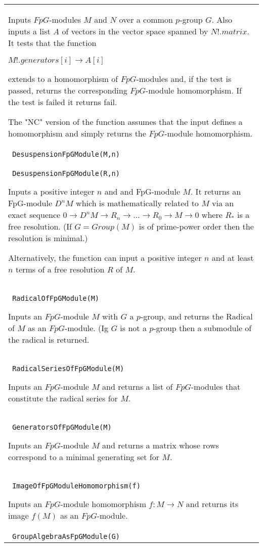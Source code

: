 \documentclass[a4paper,11pt]{report}
\begin{document}
{\begin{center}
\begin{tabular}{|l|}
 Inputs $FpG$-modules $M$ and $N$ over a common $p$-group $G$. Also inputs a list $A$ of vectors in the vector space spanned by $N!.matrix$. It tests that the function 

 $ M!.generators[i] \longrightarrow A[i]$ 

 extends to a homomorphism of $FpG$-modules and, if the test is passed, returns the corresponding $FpG$-module homomorphism. If the test is failed it returns fail. 

 The "NC" version of the function assumes that the input defines a homomorphism
and simply returns the $FpG$-module homomorphism. \\
 \index{DesuspensionFpGModule} \texttt{ DesuspensionFpGModule(M,n)} \\
 \texttt{ DesuspensionFpGModule(R,n) } 

 Inputs a positive integer $n$ and and FpG-module $M$. It returns an FpG-module $D^nM$ which is mathematically related to $M$ via an exact sequence $ 0 \longrightarrow D^nM \longrightarrow R_n \longrightarrow \ldots
\longrightarrow R_0 \longrightarrow M \longrightarrow 0$ where $R_\ast$ is a free resolution. (If $G=Group(M)$ is of prime-power order then the resolution is minimal.) 

 Alternatively, the function can input a positive integer $n$ and at least $n$ terms of a free resolution $R$ of $M$. \\
 \index{RadicalOfFpGModule} \texttt{ RadicalOfFpGModule(M) } 

 Inputs an $FpG$-module $M$ with $G$ a $p$-group, and returns the Radical of $M$ as an $FpG$-module. (Ig $G$ is not a $p$-group then a submodule of the radical is returned. \\
 \index{RadicalSeriesOfFpGModule} \texttt{ RadicalSeriesOfFpGModule(M) } 

 Inputs an $FpG$-module $M$ and returns a list of $FpG$-modules that constitute the radical series for $M$. \\
 \index{GeneratorsOfFpGModule} \texttt{ GeneratorsOfFpGModule(M) } 

 Inputs an $FpG$-module $M$ and returns a matrix whose rows correspond to a minimal generating set for $M$. \\
 \index{ImageOfFpGModuleHomomorphism} \texttt{ ImageOfFpGModuleHomomorphism(f) } 

 Inputs an $FpG$-module homomorphism $f:M \longrightarrow N$ and returns its image $f(M)$ as an $FpG$-module. \\
 \index{GroupAlgebraAsFpGModule} \texttt{ GroupAlgebraAsFpGModule(G) } 


\end{tabular}
\end{center}}
\end{document}
